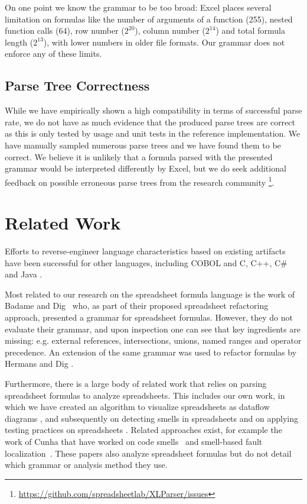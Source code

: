 \documentclass[times]{smrauth}
\begin{document}
On one point we know the grammar to be too broad: Excel places several limitation on formulas like the number of arguments of a function (255), nested function calls (64), row number ($2^{20}$), column number ($2^{14}$) and total formula length ($2^{13}$), with lower numbers in older file formats.
Our grammar does not enforce any of these limits.

\subsection{Parse Tree Correctness}

While we have empirically shown a high compatibility in terms of successful parse rate, we do not have as much evidence that the produced parse trees are correct as this is only tested by usage and unit tests in the reference implementation. We have manually sampled numerous parse trees and we have found them to be correct. We believe it is unlikely that a formula parsed with the presented grammar would be interpreted differently by Excel, but we do seek additional feedback on possible erroneous parse trees from the research community \footnote{\url{https://github.com/spreadsheetlab/XLParser/issues}}.

\section{Related Work}
\label{section:relatedWork}
Efforts to reverse-engineer language characteristics based on existing artifacts have been successful for other languages, including COBOL \cite{van1997obtaining} and C, C++, C\# and Java \cite{zaytsev2010recovery}.

Most related to our research on the spreadsheet formula language is the work of Badame and Dig~\cite{badame2012refactoring} who, as part of their proposed spreadsheet refactoring approach, presented a grammar for spreadsheet formulas. However, they do not evaluate their grammar, and upon inspection one can see that key ingredients are missing: e.g. external references, intersections, unions, named ranges and operator precedence. An extension of the same grammar was used to refactor formulas by Hermans and Dig \cite{hermans2014bumblebee}.

Furthermore, there is a large body of related work that relies on parsing spreadsheet formulas to analyze spreadsheets. This includes our own work, in which we have created an algorithm to visualize spreadsheets as dataflow diagrams \cite{DBLP:conf/icse/HermansPD11}, and subsequently on detecting smells in spreadsheets \cite{DBLP:conf/icse/HermansPD12,DBLP:conf/icsm/Hermans212} and on applying testing practices on spreadsheets \cite{Expector}. Related approaches exist, for example the work of Cunha that have worked on code smells~\cite{iccsa12} and smell-based fault localization~\cite{conf/icsme/CunhaFMPS14}. These papers also analyze spreadsheet formulas but do not detail which grammar or analysis method they use.
\end{document}
